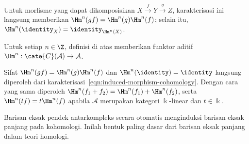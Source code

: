Untuk morfisme yang dapat dikomposisikan
$X\xrightarrow{f}Y\xrightarrow{g}Z$, karakterisasi ini langsung memberikan
$\Hm^n(gf)=\Hm^n(g)\Hm^n(f)$; selain itu,
$\Hm^n(\identity_X)=\identity_{\Hm^n(X)}$.

\begin{proposisi}\label{prop:H-functor}
	Untuk setiap $n\in\Z$, definisi di atas memberikan funktor aditif
	$\Hm^n:\cate{C}(\mathcal{A})\to\mathcal{A}$.
\end{proposisi}

\begin{bukti}
	Sifat $\Hm^n(gf)=\Hm^n(g)\Hm^n(f)$ dan
	$\Hm^n(\identity)=\identity$ langsung diperoleh dari
	karakterisasi~\eqref{eqn:induced-morphism-cohomology}. Dengan cara yang
	sama diperoleh $\Hm^n(f_1+f_2)=\Hm^n(f_1)+\Hm^n(f_2)$, serta
	$\Hm^n(tf)=t\Hm^n(f)$ apabila $\mathcal{A}$ merupakan kategori
	$\Bbbk$-linear dan $t\in\Bbbk$.
\end{bukti}

Barisan eksak pendek antarkompleks secara otomatis menginduksi barisan eksak
panjang pada kohomologi. Inilah bentuk paling dasar dari barisan eksak panjang
dalam teori homologi.

